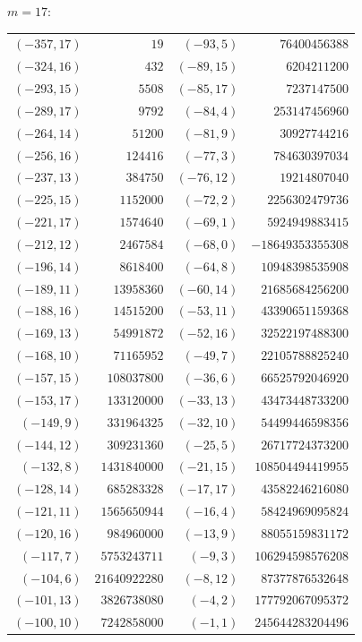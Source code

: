 \noindent$m=17$:\nopagebreak\\[2pt]
{\scriptsize\begin{tabular}{@{}r@{\ \ }r@{\qquad}r@{\ \ }r@{}}
$(-357,17)$ & $19$ & $(-93,5)$ & $76400456388$ \\
$(-324,16)$ & $432$ & $(-89,15)$ & $6204211200$ \\
$(-293,15)$ & $5508$ & $(-85,17)$ & $7237147500$ \\
$(-289,17)$ & $9792$ & $(-84,4)$ & $253147456960$ \\
$(-264,14)$ & $51200$ & $(-81,9)$ & $30927744216$ \\
$(-256,16)$ & $124416$ & $(-77,3)$ & $784630397034$ \\
$(-237,13)$ & $384750$ & $(-76,12)$ & $19214807040$ \\
$(-225,15)$ & $1152000$ & $(-72,2)$ & $2256302479736$ \\
$(-221,17)$ & $1574640$ & $(-69,1)$ & $5924949883415$ \\
$(-212,12)$ & $2467584$ & $(-68,0)$ & $-18649353355308$ \\
$(-196,14)$ & $8618400$ & $(-64,8)$ & $10948398535908$ \\
$(-189,11)$ & $13958360$ & $(-60,14)$ & $21685684256200$ \\
$(-188,16)$ & $14515200$ & $(-53,11)$ & $43390651159368$ \\
$(-169,13)$ & $54991872$ & $(-52,16)$ & $32522197488300$ \\
$(-168,10)$ & $71165952$ & $(-49,7)$ & $22105788825240$ \\
$(-157,15)$ & $108037800$ & $(-36,6)$ & $66525792046920$ \\
$(-153,17)$ & $133120000$ & $(-33,13)$ & $43473448733200$ \\
$(-149,9)$ & $331964325$ & $(-32,10)$ & $54499446598356$ \\
$(-144,12)$ & $309231360$ & $(-25,5)$ & $26717724373200$ \\
$(-132,8)$ & $1431840000$ & $(-21,15)$ & $108504494419955$ \\
$(-128,14)$ & $685283328$ & $(-17,17)$ & $43582246216080$ \\
$(-121,11)$ & $1565650944$ & $(-16,4)$ & $58424969095824$ \\
$(-120,16)$ & $984960000$ & $(-13,9)$ & $88055159831172$ \\
$(-117,7)$ & $5753243711$ & $(-9,3)$ & $106294598576208$ \\
$(-104,6)$ & $21640922280$ & $(-8,12)$ & $87377876532648$ \\
$(-101,13)$ & $3826738080$ & $(-4,2)$ & $177792067095372$ \\
$(-100,10)$ & $7242858000$ & $(-1,1)$ & $245644283204496$ \\
\end{tabular}}\par\medskip
